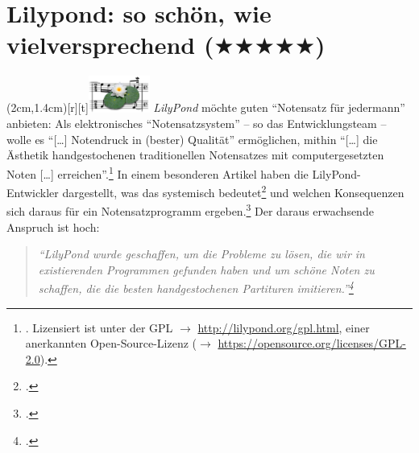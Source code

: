 %
%
%



\section{Lilypond: so schön, wie vielversprechend ($\bigstar\bigstar\bigstar\bigstar\bigstar$)}

\parpic(2cm,1.4cm)[r][t]{\includegraphics[width=2cm]{logos/lilypond-300dpi.png}}
\textit{LilyPond} möchte guten \enquote{Notensatz für jedermann} anbieten: Als
elektronisches \enquote{Notensatzsystem} -- so das Entwicklungsteam -- wolle es
\enquote{[\ldots] Notendruck in (bester) Qualität} ermöglichen, mithin
\enquote{[\ldots] die Ästhetik handgestochenen traditionellen Notensatzes mit
computergesetzten Noten [\ldots] erreichen}.\footnote{\cite[vgl.][\nopage
wp.]{LilyPond2018a}. Lizensiert ist  unter der GPL $\rightarrow$
\href{http://lilypond.org/gpl.html}{http://lilypond.org/gpl.html}, einer
anerkannten Open-Source-Lizenz ($\rightarrow$
\href{https://opensource.org/licenses/GPL-2.0}
{https://opensource.org/licenses/GPL-2.0}). } In einem besonderen Artikel haben
die LilyPond-Entwickler dargestellt, was das systemisch
bedeutet\footcite[vgl.][5ff]{LilyPond2018d} und welchen Konsequenzen sich daraus
für ein Notensatzprogramm ergeben.\footcite[vgl.][8ff]{LilyPond2018d} Der daraus
erwachsende Anspruch ist hoch:

\begin{quote}\textit{\enquote{LilyPond wurde geschaffen, um die Probleme zu
lösen, die wir in existierenden Programmen gefunden haben und um schöne Noten zu
schaffen, die die besten handgestochenen Partituren
imitieren.}\footcite[vgl.][2]{LilyPond2018d} }
\end{quote}

